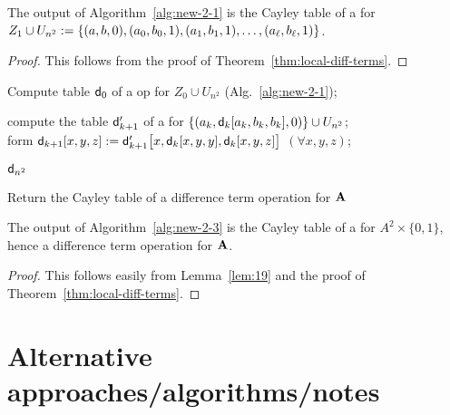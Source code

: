 \begin{lemma}
  \label{lem:19}
  The output of Algorithm~\ref{alg:new-2-1} is the Cayley table of a \ldto for
  $Z_1 \cup U_{n^2}:=  \{(a, b,0),(a_0, b_0,1), (a_1, b_1,1), \dots, (a_{\ell}, b_{\ell}, 1)\}$.
\end{lemma}

\begin{proof}
  This follows from the proof of Theorem~\ref{thm:local-diff-terms}. 
\end{proof}

\begin{algorithm}

  Compute table $\mathsf{d}_0$ of a \ldt op for $Z_0 \cup U_{n^2}$ (Alg.~\ref{alg:new-2-1});

   {

    compute the table $\mathsf{d}'_{k+1}$ of a \ldto for $\{(a_k, \mathsf{d}_{k}[a_k, b_k, b_k], 0)\} \cup U_{n^2}$;\\[4pt]

    form $\mathsf{d}_{k+1}[x,y,z] := \mathsf{d}'_{k+1}\bigl[x, \mathsf{d}_{k}[x,y,y], \mathsf{d}_{k}[x,y,z]\bigr]$ $(\forall x,y,z)$;
  }
  \Return $\mathsf{d}_{n^2}$
  \caption{Return the Cayley table of a difference term operation for $\mathbf{A}$\label{alg:new-2-3}}
\end{algorithm}


\begin{prop}
  The output of Algorithm~\ref{alg:new-2-3} is the Cayley table of a \ldto for $A^2 \times \{0,1\}$, hence a difference term operation for $\mathbf{A}$.
\end{prop}

\begin{proof}
This follows easily from Lemma~\ref{lem:19} and the proof of Theorem~\ref{thm:local-diff-terms}. 
\end{proof}


  
  




  \newpage
  \appendix

    \section{Alternative approaches/algorithms/notes}
